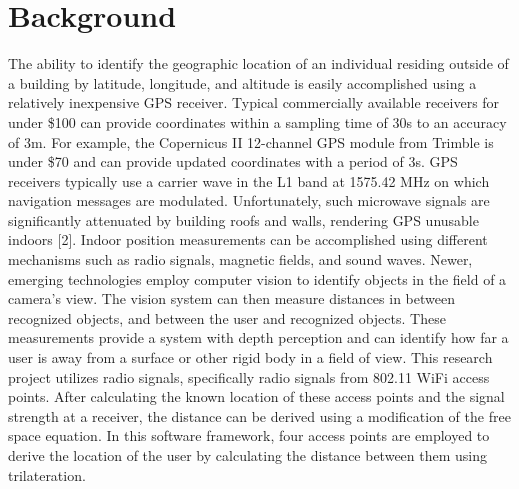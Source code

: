 \documentclass[conference]{IEEEtran}
\begin{document}
\section{Background}
\noindent  The ability to identify the geographic location of an individual residing outside of a building by latitude, longitude, and altitude is easily accomplished using a relatively inexpensive GPS receiver. Typical commercially available receivers for under \$100 can provide coordinates within a sampling time of 30s to an accuracy of \newcommand{\rpm}{\raisebox{.2ex}{$\scriptstyle\pm$}} 3m. For example, the Copernicus II 12-channel GPS module from Trimble is under \$70 and can provide updated coordinates with a period of 3s. GPS receivers typically use a carrier wave in the L1 band at 1575.42 MHz on which navigation messages are modulated. Unfortunately, such microwave signals are significantly attenuated by building roofs and walls, rendering GPS unusable indoors [2].
Indoor position measurements can be accomplished using different mechanisms such as radio signals, magnetic fields, and sound waves. Newer, emerging technologies employ computer vision to identify objects in the field of a camera's view. The vision system can then measure distances in between recognized objects, and between the user and recognized objects. These measurements provide a system with depth perception and can identify how far a user is away from a surface or other rigid body in a field of view.
This research project utilizes radio signals, specifically radio signals from 802.11 WiFi access points. After calculating the known location of these access points and the signal strength at a receiver, the distance can be derived using a modification of the free space equation. In this software framework, four access points are employed to derive the location of the user by calculating the distance between them using trilateration.
\end{document}
